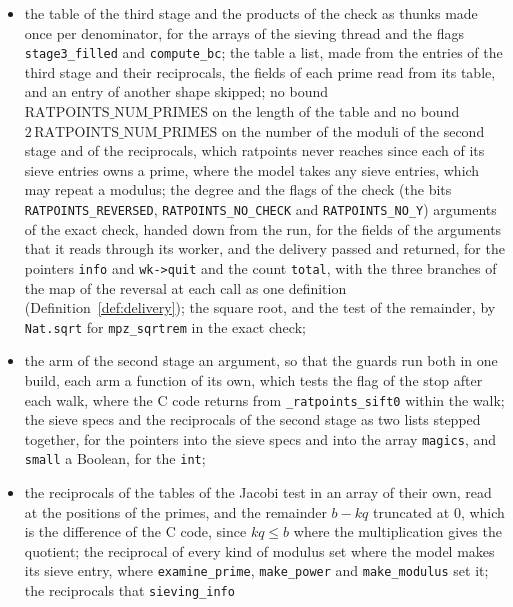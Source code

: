 \begin{itemize}
    the multiplication is exact; the comparison $2 p H < \mathrm{stage3Limit}$ of natural numbers,
    for the comparison of \verb|double|s, which has the same outcome for every $H < 2^{63}$;
  \item the table of the third stage and the products of the check as thunks made once per
    denominator, for the arrays of the sieving thread and the flags \verb|stage3_filled| and
    \verb|compute_bc|; the table a list, made from the entries of the third stage and their
    reciprocals, the fields of each prime read from its table, and an entry of another shape
    skipped; no bound $\mathrm{RATPOINTS\_NUM\_PRIMES}$ on the length of the table and no bound
    $2\,\mathrm{RATPOINTS\_NUM\_PRIMES}$ on the number of the moduli of the second stage and of the
    reciprocals, which ratpoints never reaches since each of its sieve entries owns a prime, where
    the model takes any sieve entries, which may repeat a modulus; the degree and the flags of the
    check (the bits \verb|RATPOINTS_REVERSED|, \verb|RATPOINTS_NO_CHECK| and \verb|RATPOINTS_NO_Y|)
    arguments of the exact check, handed down from the run, for the fields of the arguments that it
    reads through its worker, and the delivery passed and returned, for the pointers \verb|info| and
    \verb|wk->quit| and the count \verb|total|, with the three branches of the map of the reversal
    at each call as one definition (Definition~\ref{def:delivery}); the square root, and the test of
    the remainder, by \verb|Nat.sqrt| for \verb|mpz_sqrtrem| in the exact check;
  \item the arm of the second stage an argument, so that the guards run both in one build, each arm
    a function of its own, which tests the flag of the stop after each walk, where the C code
    returns from \verb|_ratpoints_sift0| within the walk; the sieve specs and the reciprocals of the
    second stage as two lists stepped together, for the pointers into the sieve specs and into the
    array \verb|magics|, and \verb|small| a Boolean, for the \verb|int|;
  \item the reciprocals of the tables of the Jacobi test in an array of their own, read at the
    positions of the primes, and the remainder $b - k q$ truncated at $0$, which is the difference
    of the C code, since $k q \le b$ where the multiplication gives the quotient; the reciprocal of
    every kind of modulus set where the model makes its sieve entry, where \verb|examine_prime|,
    \verb|make_power| and \verb|make_modulus| set it; the reciprocals that \verb|sieving_info|

\end{itemize}
